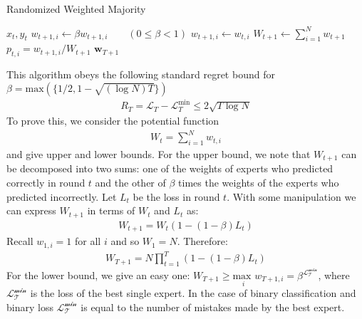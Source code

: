 \documentclass{article}
\begin{document}
\begin{algorithm}[H]
\caption{Randomized Weighted Majority}
\label{rwmalgo}
\begin{algorithmic}[1]
\EndFor
{}
    \State {} $x_t, y_t$
            \State $w_{t+1,i} \leftarrow \beta w_{t+1,i} \quad\quad(0 \le \beta < 1)$
        \Else
            \State $w_{t+1,i} \leftarrow w_{t,i}$
        \EndIf
    \EndFor
    \State $W_{t+1} \leftarrow \sum_{i=1}^N w_{t+1}$
        \State $p_{t,i} = w_{t+1, i}/W_{t+1}$
    \EndFor
\EndFor
\State \Return $\textbf{w}_{T+1}$
\end{algorithmic}
\end{algorithm}
This algorithm obeys the following standard regret bound\cite{mohri2012foundations} for $\beta = \text{max}(\lbrace 1/2, 1-\sqrt{(\log N) T}\rbrace)$
\begin{align*}
R_T = \mathcal{L}_T - \mathcal{L}_T^{\text{min}} \le 2\sqrt{T \log N}
\end{align*}
To prove this, we consider the potential function
\begin{align*}
W_{t} = \sum_{i=1}^N w_{t,i}
\end{align*}
\noindent and give upper and lower bounds. For the upper bound, we note that $W_{t+1}$ can be decomposed into two sums: one of the weights of experts who predicted correctly in round $t$ and the other of $\beta$ times the weights of the experts who predicted incorrectly. Let $L_t$ be the loss in round $t$. With some manipulation we can express $W_{t+1}$ in terms of $W_{t}$ and $L_t$ as:
\begin{align*}
W_{t+1} = W_t(1-(1-\beta)L_t)
\end{align*}
\noindent Recall $w_{1,i} = 1$ for all $i$ and so $W_1 = N$. Therefore:
\begin{align*}
W_{T+1} = N \prod_{t=1}^T (1-(1-\beta)L_t)
\end{align*}
\noindent For the lower bound, we give an easy one: $W_{T+1} \ge \underset{i}{\text{max }} w_{T+1,i}=\beta^{\mathcal{L_T^\text{min}}}$, where $\mathcal{L_T^\text{min}}$ is the loss of the best single expert. In the case of binary classification and binary loss $\mathcal{L_T^\text{min}}$ is equal to the number of mistakes made by the best expert.
\end{document}
